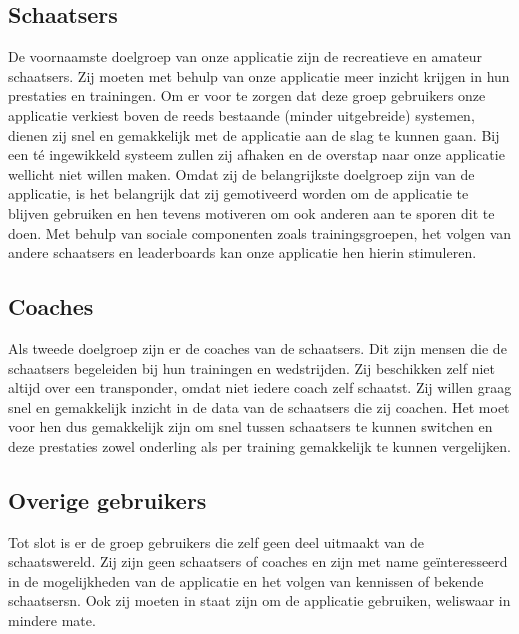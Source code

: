\newcommand{\doelgroep}{}
\label{sec:doelgroep}

\subsection{Schaatsers}
De voornaamste doelgroep van onze applicatie zijn de recreatieve en amateur schaatsers. Zij moeten met behulp van onze applicatie meer inzicht krijgen in hun prestaties en trainingen. 
Om er voor te zorgen dat deze groep gebruikers onze applicatie verkiest boven de reeds bestaande (minder uitgebreide) systemen, dienen zij snel en gemakkelijk met de applicatie aan de slag te kunnen gaan.
Bij een té ingewikkeld systeem zullen zij afhaken en de overstap naar onze applicatie wellicht niet willen maken.
Omdat zij de belangrijkste doelgroep zijn van de applicatie, is het belangrijk dat zij gemotiveerd worden om de applicatie te blijven gebruiken en hen tevens motiveren om ook anderen aan te sporen dit te doen.
Met behulp van sociale componenten zoals trainingsgroepen, het volgen van andere schaatsers en leaderboards kan onze applicatie hen hierin stimuleren.
\subsection{Coaches}
Als tweede doelgroep zijn er de coaches van de schaatsers. Dit zijn mensen die de schaatsers begeleiden bij hun trainingen en wedstrijden. Zij beschikken zelf niet altijd over een transponder, omdat niet iedere coach zelf schaatst.
Zij willen graag snel en gemakkelijk inzicht in de data van de schaatsers die zij coachen. Het moet voor hen dus gemakkelijk zijn om snel tussen schaatsers te kunnen switchen en deze prestaties zowel onderling als per training gemakkelijk te kunnen vergelijken.
\subsection{Overige gebruikers}
Tot slot is er de groep gebruikers die zelf geen deel uitmaakt van de schaatswereld. Zij zijn geen schaatsers of coaches en zijn met name geïnteresseerd in de mogelijkheden van de applicatie en het volgen van kennissen of bekende schaatsersn.
Ook zij moeten in staat zijn om de applicatie gebruiken, weliswaar in mindere mate.
